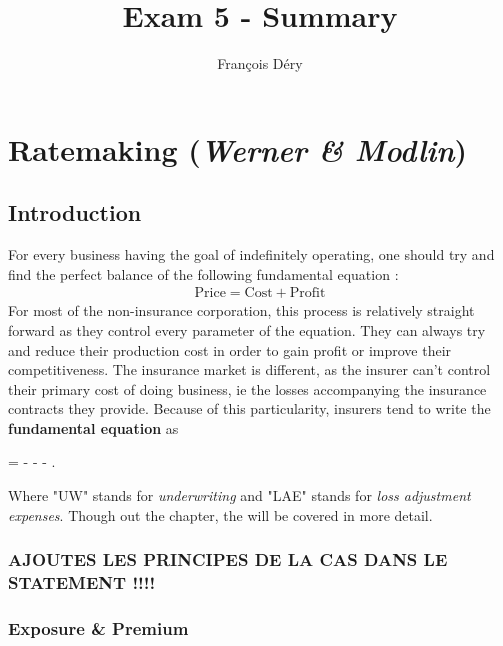 \documentclass[11pt, english]{memoir}
\numberwithin{definition}{section}
\begin{document}
\title{\normalfont\textbf{Exam 5 - Summary}}
\author{François Déry}
\date{}
\maketitle

{\color{black}\tableofcontents}


\part{Ratemaking (\emph{Werner \& Modlin})}
\chapter{Introduction}
For every business having the goal of indefinitely operating, one should try and find the perfect balance of the following fundamental equation : 
\begin{align*}
\text{Price} = \text{Cost} + \text{Profit}
\end{align*}
For most of the non-insurance corporation, this process is relatively straight forward as they control every parameter of the equation. They can always try and reduce their production cost in order to gain profit or improve their competitiveness. The insurance market is different, as the insurer can't control their primary cost of doing business, ie the losses accompanying the insurance contracts they provide. Because of this particularity, insurers tend to write the \textbf{fundamental equation} as 
\begin{tcolorbox}
 =  -  -  - .
\end{tcolorbox}
Where "UW" stands for \emph{underwriting} and "LAE" stands for \emph{loss adjustment expenses}. Though out the chapter, the will be covered in more detail. 


\section{AJOUTES LES PRINCIPES DE LA CAS DANS LE STATEMENT !!!!}


\section{Exposure \& Premium}
\end{document}
